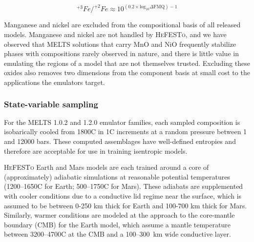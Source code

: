 \begin{equation}
^{+3}Fe/^{+2}Fe \approx 10^{\left(0.2 \times \text{log}_{10}\Delta\text{FMQ} \right) - 1}
\label{eq:fO2ratio}
\end{equation}

Manganese and nickel are excluded from the compositional basis of all released
models. Manganese and nickel are not handled by \textsc{HeFESTo}, and we have 
observed that \textsc{MELTS} solutions that carry MnO and NiO frequently stabilize
phases with compositions rarely observed in nature, and there is little value in
emulating the regions of a model that are not themselves trusted. Excluding these
oxides also removes two dimensions from the component basis at small cost to
the applications the emulators target.

\subsubsection{State-variable sampling}\label{state-var-sampling}

For the \textsc{MELTS} 1.0.2 and 1.2.0 emulator families, each sampled composition is isobarically cooled from 1800\textdegree C in 1\textdegree C increments
at a random pressure between 1 and 12000 bars. These computed assemblages have well-defined entropies and therefore are acceptable for use in training isentropic models. 

\textsc{HeFESTo} Earth and Mars models are each trained around a core of (approximately) adiabatic simulations at reasonable potential temperatures 
(1200--1650\textdegree C for Earth; 500--1750\textdegree C for Mars). These adiabats are supplemented with cooler conditions due to a conductive lid regime near the surface, 
which is assumed to be between 0-250 km thick for Earth and 100-700 km thick for Mars. %
Similarly, warmer conditions are modeled at the approach to the core-mantle boundary (CMB) for the Earth model, which assume a mantle temperature between 
3200--4700\textdegree C at the CMB and a 100--300~km wide conductive layer.

